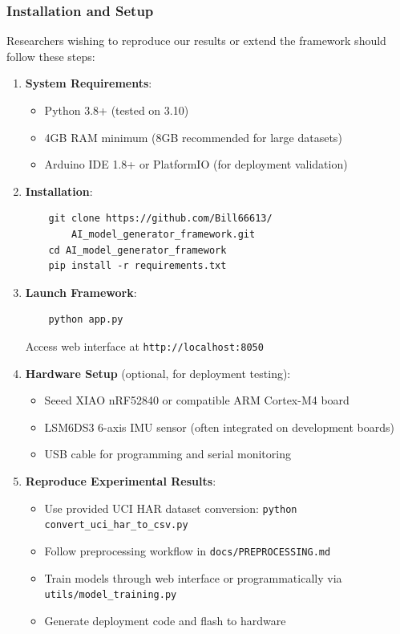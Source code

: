 \subsubsection{Installation and Setup}
Researchers wishing to reproduce our results or extend the framework should follow these steps:

\begin{enumerate}
    \item \textbf{System Requirements}:
    \begin{itemize}
        \item Python 3.8+ (tested on 3.10)
        \item 4GB RAM minimum (8GB recommended for large datasets)
        \item Arduino IDE 1.8+ or PlatformIO (for deployment validation)
    \end{itemize}
    
    \item \textbf{Installation}:
    \begin{verbatim}
    git clone https://github.com/Bill66613/
        AI_model_generator_framework.git
    cd AI_model_generator_framework
    pip install -r requirements.txt
    \end{verbatim}
    
    \item \textbf{Launch Framework}:
    \begin{verbatim}
    python app.py
    \end{verbatim}
    Access web interface at \texttt{http://localhost:8050}
    
    \item \textbf{Hardware Setup} (optional, for deployment testing):
    \begin{itemize}
        \item Seeed XIAO nRF52840 or compatible ARM Cortex-M4 board
        \item LSM6DS3 6-axis IMU sensor (often integrated on development boards)
        \item USB cable for programming and serial monitoring
    \end{itemize}
    
    \item \textbf{Reproduce Experimental Results}:
    \begin{itemize}
        \item Use provided UCI HAR dataset conversion: \texttt{python convert\_uci\_har\_to\_csv.py}
        \item Follow preprocessing workflow in \texttt{docs/PREPROCESSING.md}
        \item Train models through web interface or programmatically via \texttt{utils/model\_training.py}
        \item Generate deployment code and flash to hardware
    \end{itemize}
\end{enumerate}

